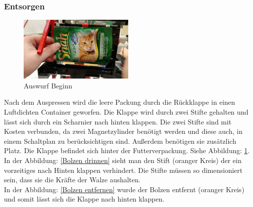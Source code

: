 \subsubsection{Entsorgen}

\begin{figure}
\vspace{-30pt}
  \begin{center}
    \includegraphics[width=0.50\textwidth]{Bilder/Ablauf_1_png/Auswurf_1}
  \end{center}
  \caption{Auswurf Beginn}
  \label{Auswurf Beginn}
  \vspace{-10pt}
\end{figure}

Nach dem Auspressen wird die leere Packung durch die Rückklappe in einen Luftdichten Container geworfen. Die Klappe wird durch zwei Stifte gehalten und lässt sich durch ein Scharnier nach hinten klappen. Die zwei Stifte sind mit Kosten verbunden, da zwei Magnetzylinder benötigt werden und diese auch, in einem Schaltplan zu berücksichtigen sind. Außerdem benötigen sie zusätzlich Platz. Die Klappe befindet sich hinter der Futterverpackung. Siehe Abbildung: \ref{Auswurf Beginn}. \\

In der Abbildung: \ref{Bolzen drinnen} sieht man den Stift (oranger Kreis) der ein vorzeitiges nach Hinten klappen verhindert. Die Stifte müssen so dimensioniert sein, dass sie die Kräfte der Walze aushalten. \\

In der Abbildung: \ref{Bolzen entfernen} wurde der Bolzen entfernt (oranger Kreis) und somit lässt sich die Klappe nach hinten klappen. 

